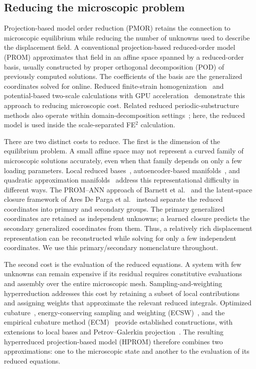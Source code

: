 \subsection{Reducing the microscopic problem}
Projection-based model order reduction (PMOR) retains the connection to microscopic equilibrium while reducing the number of unknowns used to describe the displacement field. A conventional projection-based reduced-order model (PROM) approximates that field in an affine space spanned by a reduced-order basis, usually constructed by proper orthogonal decomposition (POD) of previously computed solutions. The coefficients of the basis are the generalized coordinates solved for online. Reduced finite-strain homogenization~\cite{yvonnet2007,Hernandez2014} and potential-based two-scale calculations with GPU acceleration~\cite{Fritzen2016} demonstrate this approach to reducing microscopic cost. Related reduced periodic-substructure methods also operate within domain-decomposition settings~\cite{Hernandez2020}; here, the reduced model is used inside the scale-separated FE$^2$ calculation.

There are two distinct costs to reduce. The first is the dimension of the equilibrium problem. A small affine space may not represent a curved family of microscopic solutions accurately, even when that family depends on only a few loading parameters. Local reduced bases~\cite{Amsallem2012}, autoencoder-based manifolds~\cite{Lee2020}, and quadratic approximation manifolds~\cite{Barnett2022} address this representational difficulty in different ways. The PROM--ANN approach of Barnett et al.~\cite{barnett2023} and the latent-space closure framework of Ares De Parga et al.~\cite{aresdeparga2026nonlinear} instead separate the reduced coordinates into primary and secondary groups. The primary generalized coordinates are retained as independent unknowns; a learned closure predicts the secondary generalized coordinates from them. Thus, a relatively rich displacement representation can be reconstructed while solving for only a few independent coordinates. We use this primary/secondary nomenclature throughout.

The second cost is the evaluation of the reduced equations. A system with few unknowns can remain expensive if its residual requires constitutive evaluations and assembly over the entire microscopic mesh. Sampling-and-weighting hyperreduction addresses this cost by retaining a subset of local contributions and assigning weights that approximate the relevant reduced integrals. Optimized cubature~\cite{An2008}, energy-conserving sampling and weighting (ECSW)~\cite{Farhat2014,farhat2015}, and the empirical cubature method (ECM)~\cite{hernandez2017} provide established constructions, with extensions to local bases and Petrov--Galerkin projection~\cite{Grimberg2021,AresDeParga2023}. The resulting hyperreduced projection-based model (HPROM) therefore combines two approximations: one to the microscopic state and another to the evaluation of its reduced equations.


